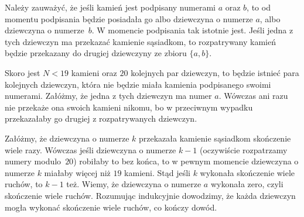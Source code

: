 \vspace{10px}
\noindent
Należy zauważyć, że jeśli kamień jest podpisany numerami $a$ oraz $b$, to od momentu podpisania będzie posiadała go albo dziewczyna o numerze $a$, albo dziewczyna o numerze~$b$. W momencie podpisania tak istotnie jest. Jeśli jedna z tych dziewczyn ma przekazać kamienie sąsiadkom, to rozpatrywany kamień będzie przekazany do drugiej dziewczyny ze zbioru $\{a, b\}$.

\vspace{10px}
\noindent
Skoro jest $N < 19$ kamieni oraz $20$ kolejnych par dziewczyn, to będzie istnieć para kolejnych dziewczyn, która nie będzie miała kamienia podpisanego swoimi numerami. Załóżmy, że jedna z tych dziewczyn ma numer $a$. Wówczas ani razu nie przekaże ona swoich kamieni nikomu, bo w przeciwnym wypadku przekazałaby go drugiej z rozpatrywanych dziewczyn.


\vspace{10px}
\noindent
Załóżmy, że dziewczyna o numerze $k$ przekazała kamienie sąsiadkom skończenie wiele razy. Wówczas jeśli dziewczyna o numerze $k - 1$ (oczywiście rozpatrzamy numery modulo~$20$) robiłaby to bez końca, to w pewnym momencie dziewczyna o numerze $k$ miałaby więcej niż $19$ kamieni. Stąd jeśli $k$ wykonała skończenie wiele ruchów, to $k - 1$ też. Wiemy, że dziewczyna o numerze $a$ wykonała zero, czyli skończenie wiele ruchów. Rozumując indukcyjnie dowodzimy, że każda dziewczyn mogła wykonać skończenie wiele ruchów, co kończy dowód.